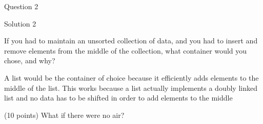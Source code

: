 \documentclass[10pt,addpoints]{exam}
\begin{document}
\begin{questions}
\par\vspace{0.100000in}\begin{minipage}{\linewidth}
\question[8]
Question 2
\begin{solutionbox}{0in}
Solution 2
\end{solutionbox}
\end{minipage}


\par\vspace{0.100000in}\begin{minipage}{\linewidth}
\question[10]

If you had to maintain an unsorted collection of data, and you had to insert
and remove elements from the middle of the collection, what container would
you chose, and why?

\begin{solutionbox}{3in}

A list would be the container of choice because it efficiently adds elements
to the middle of the list. This works because a list actually implements a
doubly linked list and no data has to be shifted in order to add elements to
the middle

\end{solutionbox}
\end{minipage}


\par\vspace{0.100000in}\begin{minipage}{\linewidth}
\question (10 points) What if there were no air?
\end{minipage}



\end{questions}
\end{document}
